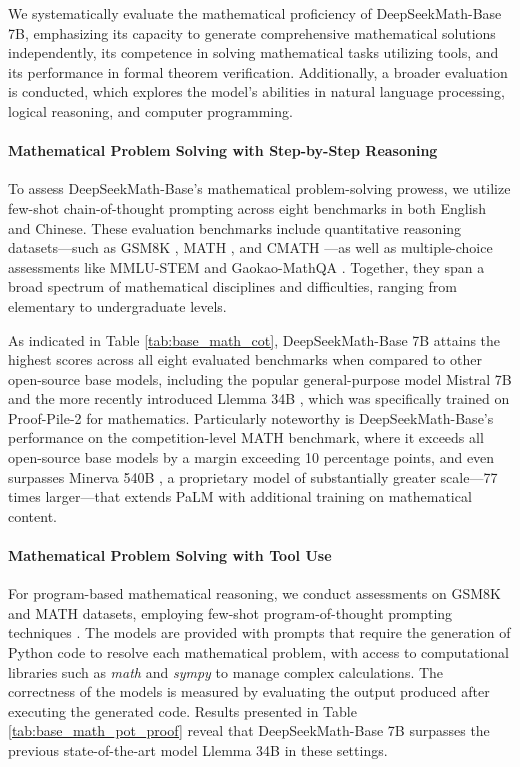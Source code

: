 We systematically evaluate the mathematical proficiency of DeepSeekMath-Base 7B, emphasizing its capacity to generate comprehensive mathematical solutions independently, its competence in solving mathematical tasks utilizing tools, and its performance in formal theorem verification. Additionally, a broader evaluation is conducted, which explores the model’s abilities in natural language processing, logical reasoning, and computer programming.

\paragraph{Mathematical Problem Solving with Step-by-Step Reasoning}

To assess DeepSeekMath-Base’s mathematical problem-solving prowess, we utilize few-shot chain-of-thought prompting \citep{cot} across eight benchmarks in both English and Chinese. These evaluation benchmarks include quantitative reasoning datasets—such as GSM8K \citep{gsm8k}, MATH \citep{MATH}, and CMATH \citep{wei2023cmath}—as well as multiple-choice assessments like MMLU-STEM \citep{mmlu} and Gaokao-MathQA \citep{agieval}. Together, they span a broad spectrum of mathematical disciplines and difficulties, ranging from elementary to undergraduate levels.

As indicated in Table \ref{tab:base_math_cot}, DeepSeekMath-Base 7B attains the highest scores across all eight evaluated benchmarks when compared to other open-source base models, including the popular general-purpose model Mistral 7B \citep{mistral} and the more recently introduced Llemma 34B \citep{llemma}, which was specifically trained on Proof-Pile-2 \citep{llemma} for mathematics. Particularly noteworthy is DeepSeekMath-Base's performance on the competition-level MATH benchmark, where it exceeds all open-source base models by a margin exceeding 10 percentage points, and even surpasses Minerva 540B \citep{minerva}, a proprietary model of substantially greater scale—77 times larger—that extends PaLM \citep{palm} with additional training on mathematical content.

\paragraph{Mathematical Problem Solving with Tool Use} 

For program-based mathematical reasoning, we conduct assessments on GSM8K and MATH datasets, employing few-shot program-of-thought prompting techniques \citep{pot,pal}. The models are provided with prompts that require the generation of Python code to resolve each mathematical problem, with access to computational libraries such as \textit{math} and \textit{sympy} to manage complex calculations. The correctness of the models is measured by evaluating the output produced after executing the generated code. Results presented in Table \ref{tab:base_math_pot_proof} reveal that DeepSeekMath-Base 7B surpasses the previous state-of-the-art model Llemma 34B in these settings.

